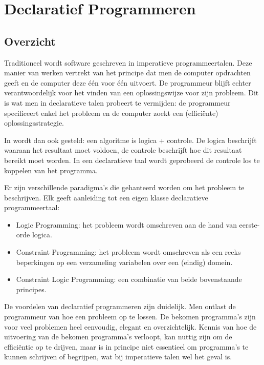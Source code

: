 
\chapter{Declaratief Programmeren} \label{chap:decl}

\section{Overzicht} \label{sec:decl-overz}

Traditioneel wordt software geschreven in imperatieve programmeertalen. Deze manier van werken vertrekt van het principe dat men de computer opdrachten geeft en de computer deze \'e\'en voor \'e\'en uitvoert. De programmeur blijft echter verantwoordelijk voor het vinden van een oplossingswijze voor zijn probleem. Dit is wat men in declaratieve talen probeert te vermijden: de programmeur specificeert enkel het probleem en de computer zoekt een (effici\"ente) oplossingsstrategie.

In \cite{kowalski} wordt dan ook gesteld: een algoritme is logica + controle. De logica beschrijft waaraan het resultaat moet voldoen, de controle beschrijft hoe dit resultaat bereikt moet worden. In een declaratieve taal wordt geprobeerd de controle los te koppelen van het programma.

Er zijn verschillende paradigma's die gehanteerd worden om het probleem te beschrijven. Elk geeft aanleiding tot een eigen klasse declaratieve programmeertaal: \begin{itemize}
\item Logic Programming: het probleem wordt omschreven aan de hand van eerste-orde logica.
\item Constraint Programming: het probleem wordt omschreven als een reeks beperkingen op een verzameling variabelen over een (eindig) domein.
\item Constraint Logic Programming: een combinatie van beide bovenstaande principes.
\end{itemize}

De voordelen van declaratief programmeren zijn duidelijk. Men ontlast de programmeur van hoe een probleem op te lossen. De bekomen programma's zijn voor veel problemen heel eenvoudig, elegant en overzichtelijk. Kennis van hoe de uitvoering van de bekomen programma's verloopt, kan nuttig zijn om de effici\"entie op te drijven, maar is in principe niet essentieel om programma's te kunnen schrijven of begrijpen, wat bij imperatieve talen wel het geval is.

